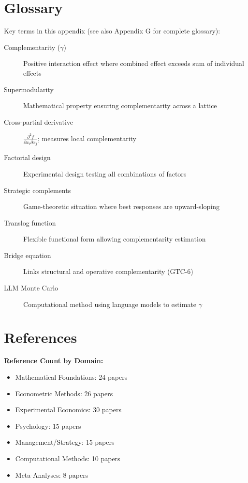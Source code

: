\section{Glossary}
\label{sec:glossary}

Key terms in this appendix (see also Appendix G for complete glossary):

\begin{description}
    \item[Complementarity ($\gamma$)] Positive interaction effect where combined effect exceeds sum of individual effects
    \item[Supermodularity] Mathematical property ensuring complementarity across a lattice
    \item[Cross-partial derivative] $\frac{\partial^2 f}{\partial x_i \partial x_j}$; measures local complementarity
    \item[Factorial design] Experimental design testing all combinations of factors
    \item[Strategic complements] Game-theoretic situation where best responses are upward-sloping
    \item[Translog function] Flexible functional form allowing complementarity estimation
    \item[Bridge equation] Links structural and operative complementarity (GTC-6)
    \item[LLM Monte Carlo] Computational method using language models to estimate $\gamma$
\end{description}

\section{References}
\label{sec:references}

\nocite{bcm_master}


\textbf{Reference Count by Domain:}
\begin{itemize}
    \item Mathematical Foundations: 24 papers
    \item Econometric Methods: 26 papers
    \item Experimental Economics: 30 papers
    \item Psychology: 15 papers
    \item Management/Strategy: 15 papers
    \item Computational Methods: 10 papers
    \item Meta-Analyses: 8 papers
\end{itemize}

